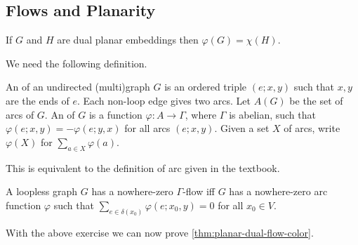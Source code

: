 \documentclass[main.tex]{subfiles}
\begin{document}
\subsection{Flows and Planarity}
\begin{theorem}
  \th\label{thm:planar-dual-flow-color}
  If $G$ and $H$ are dual planar embeddings then $\varphi(G) = \chi(H)$.
\end{theorem}
We need the following definition.
\begin{definition*}
  An  of an undirected (multi)graph $G$ is an ordered triple
  $(e;x,y)$ such that $x,y$ are the ends of $e$.
  Each non-loop edge gives two arcs.
  Let $A(G)$ be the set of arcs of $G$.
  An  of $G$ is a function $\varphi:A\to\Gamma$,
  where $\Gamma$ is abelian, such that $\varphi(e;x,y) = -\varphi(e;y,x)$ for all
  arcs $(e;x,y)$.
  Given a set $X$ of arcs, write $\varphi(X)$ for $\sum_{a\in X}\varphi(a)$.
\end{definition*}
This is equivalent to the definition of arc given in the textbook.
\begin{exercise*}
  A loopless graph $G$ has a nowhere-zero $\Gamma$-flow iff $G$ has a
  nowhere-zero arc function $\varphi$ such that
  $\sum_{e\in\delta(x_0)}\varphi(e;x_0,y) = 0$ for all $x_0\in V$.
\end{exercise*}
With the above exercise we can now prove \th\ref{thm:planar-dual-flow-color}.
\end{document}
